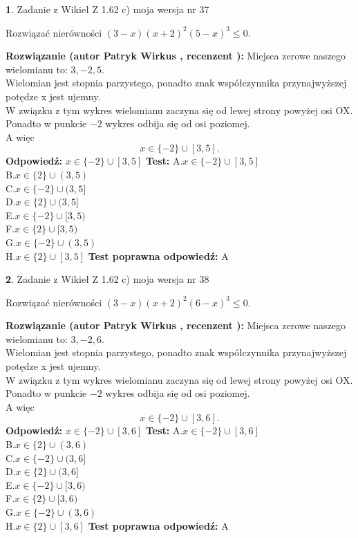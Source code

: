 \documentclass[12pt, a4paper]{article}
\theoremstyle{definition} %
\newtheorem{zad}{}
\newcommand{\zadStart}[1]{\begin{zad}#1\newline}
\newcommand{\zadStop}{\end{zad}}
\newcommand{\rozwStart}[2]{\noindent \textbf{Rozwiązanie (autor #1 , recenzent #2): }\newline}
\newcommand{\rozwStop}{\newline}
\newcommand{\odpStart}{\noindent \textbf{Odpowiedź:}\newline}
\newcommand{\odpStop}{\newline}
\newcommand{\testStart}{\noindent \textbf{Test:}\newline}
\newcommand{\testStop}{\newline}
\newcommand{\kluczStart}{\noindent \textbf{Test poprawna odpowiedź:}\newline}
\newcommand{\kluczStop}{\newline}
\begin{document}
\zadStart{Zadanie z Wikieł Z 1.62 c) moja wersja nr 37}

Rozwiązać nierówności $(3-x)(x+2)^{2}(5-x)^{3}\le0$.
\zadStop
\rozwStart{Patryk Wirkus}{}
Miejsca zerowe naszego wielomianu to: $3, -2, 5$.\\
Wielomian jest stopnia parzystego, ponadto znak współczynnika przy\linebreak najwyższej potędze x jest ujemny.\\ W związku z tym wykres wielomianu zaczyna się od lewej strony powyżej osi OX.\\
Ponadto w punkcie $-2$ wykres odbija się od osi poziomej.\\
A więc $$x \in \{-2\} \cup [3,5].$$
\rozwStop
\odpStart
$x \in \{-2\} \cup [3,5]$
\odpStop
\testStart
A.$x \in \{-2\} \cup [3,5]$\\
B.$x \in \{2\} \cup (3,5)$\\
C.$x \in \{-2\} \cup (3,5]$\\
D.$x \in \{2\} \cup (3,5]$\\
E.$x \in \{-2\} \cup [3,5)$\\
F.$x \in \{2\} \cup [3,5)$\\
G.$x \in \{-2\} \cup (3,5)$\\
H.$x \in \{2\} \cup [3,5]$
\testStop
\kluczStart
A
\kluczStop



\zadStart{Zadanie z Wikieł Z 1.62 c) moja wersja nr 38}

Rozwiązać nierówności $(3-x)(x+2)^{2}(6-x)^{3}\le0$.
\zadStop
\rozwStart{Patryk Wirkus}{}
Miejsca zerowe naszego wielomianu to: $3, -2, 6$.\\
Wielomian jest stopnia parzystego, ponadto znak współczynnika przy\linebreak najwyższej potędze x jest ujemny.\\ W związku z tym wykres wielomianu zaczyna się od lewej strony powyżej osi OX.\\
Ponadto w punkcie $-2$ wykres odbija się od osi poziomej.\\
A więc $$x \in \{-2\} \cup [3,6].$$
\rozwStop
\odpStart
$x \in \{-2\} \cup [3,6]$
\odpStop
\testStart
A.$x \in \{-2\} \cup [3,6]$\\
B.$x \in \{2\} \cup (3,6)$\\
C.$x \in \{-2\} \cup (3,6]$\\
D.$x \in \{2\} \cup (3,6]$\\
E.$x \in \{-2\} \cup [3,6)$\\
F.$x \in \{2\} \cup [3,6)$\\
G.$x \in \{-2\} \cup (3,6)$\\
H.$x \in \{2\} \cup [3,6]$
\testStop
\kluczStart
A
\kluczStop
\end{document}
